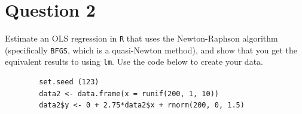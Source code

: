 \documentclass[12pt,letterpaper]{article}
\begin{document}
  
	\clearpage

\section*{Question 2}
\noindent Estimate an OLS regression in \texttt{R} that uses the Newton-Raphson algorithm (specifically \texttt{BFGS}, which is a quasi-Newton method), and show that you get the equivalent results to using \texttt{lm}. Use the code below to create your data.
\vspace{.5cm}


%

	\begin{lstlisting}
		set.seed (123)
		data2 <- data.frame(x = runif(200, 1, 10))
		data2$y <- 0 + 2.75*data2$x + rnorm(200, 0, 1.5)

	\end{lstlisting}
\end{document}
